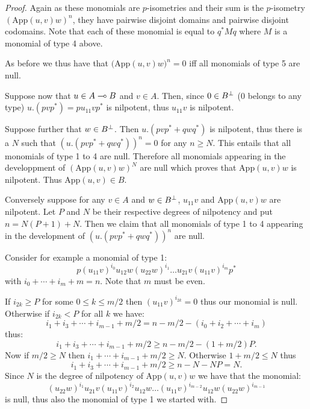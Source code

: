 \begin{proof}
Again as these monomials are $p$-isometries and their sum is the $p$-isometry $(\mathrm{App}(u,v)w)^n$, they have pairwise disjoint domains and pairwise disjoint codomains. Note that each of these monomial is equal to $q^*Mq$ where $M$ is a monomial of type 4 above.

As before we thus have that $\bigl(\mathrm{App}(u,v)w\bigr)^n = 0$ iff all monomials of type 5 are null.

Suppose now that $u\in A\multimap B$ and $v\in A$. Then, since $0\in B^\bot$ ($0$ belongs to any type) $u.(pvp^*) = pu_{11}vp^*$ is nilpotent, thus $u_{11}v$ is nilpotent.

Suppose further that $w\in B^\bot$. Then $u.(pvp^*+qwq^*)$ is nilpotent, thus there is a $N$ such that $(u.(pvp^* + qwq^*))^n=0$ for any $n\geq N$. This entails that all monomials of type 1 to 4 are null. Therefore all monomials appearing in the developpment of $(\mathrm{App}(u,v)w)^N$ are null which proves that $\mathrm{App}(u,v)w$ is nilpotent. Thus $\mathrm{App}(u,v)\in B$.

Conversely suppose for any $v\in A$ and $w\in B^\bot$, $u_{11}v$ and $\mathrm{App}(u,v)w$ are nilpotent. Let $P$ and $N$ be their respective degrees of nilpotency and put $n=N(P+1)+N$. Then we claim that all monomials of type 1 to 4 appearing in the development of $(u.(pvp^*+qwq^*))^n$ are null.

Consider for example a monomial of type 1:
\begin{equation*}
p(u_{11}v)^{i_0}u_{12}w(u_{22}w)^{i_1}\dots u_{21}v(u_{11}v)^{i_m}p^*
\end{equation*}
with $i_0+\cdots+i_m + m = n$. Note that $m$ must be even.

If $i_{2k}\geq P$ for some $0\leq k\leq m/2$ then $(u_{11}v)^{i_{2k}}=0$ thus our monomial is null. Otherwise if $i_{2k}<P$ for all $k$ we have:
\begin{equation*}
i_1+i_3+\cdots +i_{m-1} + m/2 = n - m/2 - (i_0+i_2+\cdots +i_m)
\end{equation*}
thus:
\begin{equation*}
i_1+i_3+\cdots +i_{m-1} + m/2\geq n - m/2 - (1+m/2)P.
\end{equation*}
Now if $m/2\geq N$ then $i_1+\cdots+i_{m-1}+m/2 \geq N$. Otherwise $1+m/2\leq N$ thus
\begin{equation*}
i_1+i_3+\cdots +i_{m-1} + m/2\geq n - N - NP = N.
\end{equation*}
Since $N$ is the degree of nilpotency of $\mathrm{App}(u,v)w$ we have that the monomial:
\begin{equation*}
(u_{22}w)^{i_1}u_{21}v(u_{11}v)^{i_2}u_{12}w\dots(u_{11}v)^{i_{m-2}}u_{12}w(u_{22}w)^{i_{m-1}}
\end{equation*}
is null, thus also the monomial of type 1 we started with.
\end{proof}

